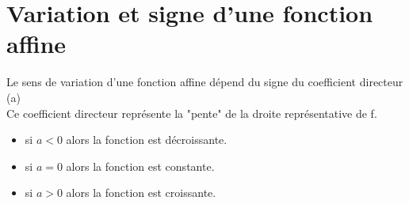 \documentclass{article}
\begin{document}
\section{\textbf{Variation et signe d'une fonction affine}}

Le sens de variation d'une fonction affine dépend du signe du coefficient directeur (a) \\
Ce coefficient directeur représente la "pente" de la droite représentative de f.
\begin{itemize}
    \item si \(a < 0\) alors la fonction est décroissante.
    \item si \(a = 0\) alors la fonction est constante.
    \item si \(a > 0\) alors la fonction est croissante.
\end{itemize}
\end{document}
